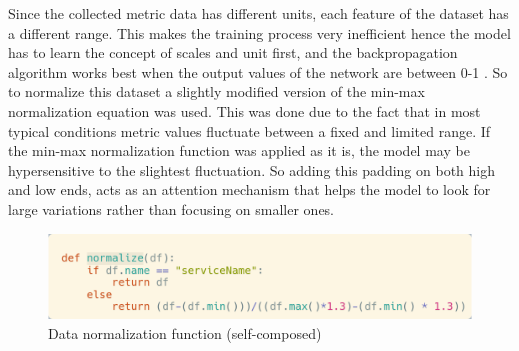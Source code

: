Since the collected metric data has different units, each feature of the dataset has a different range. This makes the training process very inefficient hence the model has to learn the concept of scales and unit first, and the backpropagation algorithm works best when the output values of the network are between 0-1 \citep{sola1997importance}. So to normalize this dataset a slightly modified version of the min-max normalization equation was used. This was done due to the fact that in most typical conditions metric values fluctuate between a fixed and limited range. If the min-max normalization function was applied as it is, the model may be hypersensitive to the slightest fluctuation. So adding this padding on both high and low ends, acts as an attention mechanism that helps the model to look for large variations rather than focusing on smaller ones.

\begin{figure}[H]
    \includegraphics[width=12cm]{assets/implementation/normalize-data.png}
    \caption{Data normalization function (self-composed)}
    \label{fig:normalize-data}
\end{figure}


